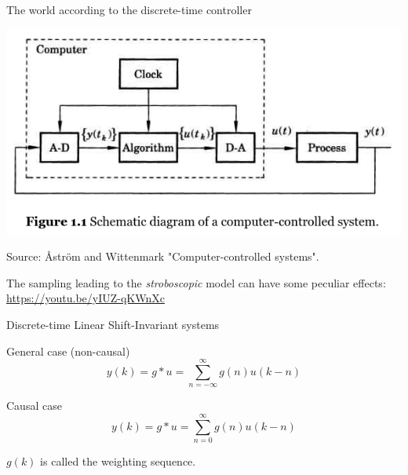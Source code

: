 \documentclass[presentation,aspectratio=169]{beamer}
\begin{document}
\begin{frame}[label={sec:org8f81bb2}]{The world according to the discrete-time controller}
\small 
\begin{center}
\includegraphics[width=0.6\linewidth]{../../figures/fig1-1-schematic.png}

Source: Åström and Wittenmark "Computer-controlled systems".
\end{center}

\pause

The sampling leading to the \emph{stroboscopic} model can have some peculiar effects: \url{https://youtu.be/yIUZ-qKWnXc}
\end{frame}

\begin{frame}[label={sec:orgb3bc405}]{Discrete-time Linear Shift-Invariant systems}
\begin{center}
\end{center}

\pause

\begin{block}{General case (non-causal)}
\[ y(k) = g \ast u = \sum_{n=-\infty}^\infty g(n) u(k-n) \]

\pause
\end{block}

\begin{block}{Causal case}
\[ y(k) = g \ast u = \sum_{n=0}^\infty g(n) u(k-n) \]


\(g(k)\) is called the \alert{weighting sequence}.
\end{block}
\end{frame}
\end{document}
